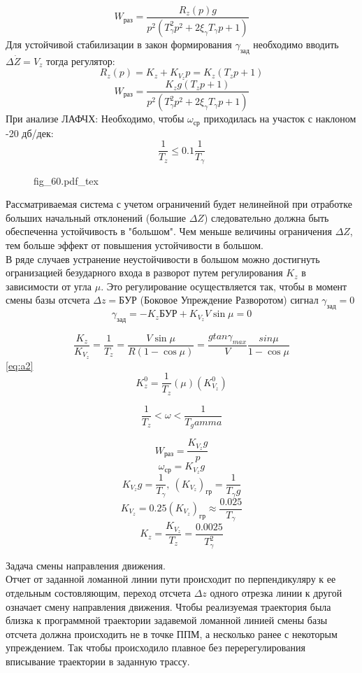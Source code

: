 \documentclass{article}
\newcommand{\incfig}[1]{
    {#1.pdf_tex}
}
\begin{document}
\[
    W_{раз} = \frac{R_z(p)g}{p^2(T_\gamma^2 p^2 + 2 \xi_\gamma T_\gamma p + 1)}
\]
Для устойчивой стабилизации в закон формирования $\gamma_{зад}$ необходимо вводить $\Delta \dot{Z} = V_{z}$ тогда регулятор:
\[
    R_z(p) = K_z + K_{V_z} p = K_z(T_z p +1)
\]
\[
    W_{раз} = \frac{K_z g(T_z p + 1)}{p^2(T_\gamma^2 p^2 + 2 \xi_\gamma T_\gamma p + 1)}
\]
При анализе ЛАФЧХ: 
Необходимо, чтобы $ \omega_{ср}$ приходилась на участок с наклоном -20 дб/дек:
\begin{equation}
    \frac{1}{T_z} \le 0.1 \frac{1}{T_\gamma}
    \label{eq:a2}
\end{equation}

\begin{figure}[H]
    \centering
    \incfig{fig_60}
    \label{fig:fig_60}
\end{figure}

Рассматриваемая система с учетом ограничений будет нелинейной при отработке больших начальный отклонений (большие $\Delta Z$) следовательно должна быть обеспеченна устойчивость в "большом". 
Чем меньше величины ограничения $\Delta Z$, тем больше эффект от повышения устойчивости в большом.\\
В ряде случаев устранение неустойчивости в большом можно достигнуть огранизацией безударного входа в разворот путем регулирования $K_z$ в зависимости от угла $\mu$.
Это регулирование осуществляется так, чтобы в момент смены базы отсчета $\Delta z = {БУР}$ (Боковое Упреждение Разворотом) сигнал $ \gamma_{зад} =  0$ 
\[
    \gamma_{зад} = -K_z БУР + K_{V_z} V \sin{\mu} = 0
\]

\[
    \frac{K_z}{K_{V_z}} = \frac{1}{T_z} = \frac{V \sin{\mu}}{R( 1 - \cos{\mu})} = \frac{g tan{\gamma_{max}}}{V} \frac{sin{\mu}}{1 - \cos{\mu}}
\]
\ref{eq:a2}
\[
    K_z^0 = \frac{1}{T_z}(\mu)(K_{V_z}^0)
\]

\[
    \frac{1}{T_z} < \omega < \frac{1}{T_gamma}
\]

\[
    W_{раз} = \frac{K_{V_z} g}{p}
\]
\[
    \omega_{ср} = K_{V_z} g
\]
\[
    K_{V_z} g = \frac{1}{T_\gamma} , \ (K_{V_z})_{гр} = \frac{1}{T_\gamma g}
\]
\[
    K_{V_z} = 0.25(K_{V_z})_{гр} \approx \frac{0.025}{T_{\gamma}}
\]
\[
    K_z = \frac{K_{V_z}}{T_z} = \frac{0.0025}{T_\gamma^2}
\]

Задача смены направления движения.\\
Отчет от заданной ломанной линии пути происходит по перпендикуляру к ее отдельным состовляющим, переход отсчета $\Delta z$ одного отрезка линии к другой означает смену направления движения. Чтобы реализуемая траектория была близка к программной траектории задавемой ломанной линией смены базы отсчета должна происходить не в точке ППМ, а несколько ранее с некоторым упреждением. Так чтобы происходило плавное без перерегулирования вписывание траектории в заданную трассу.\\
\end{document}
